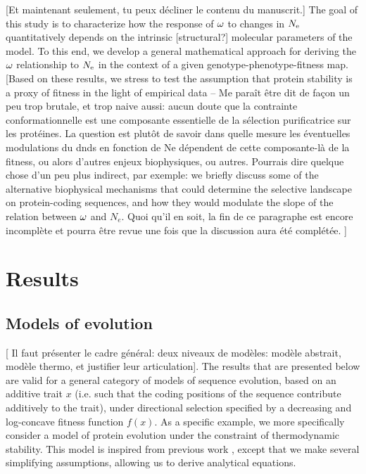 \documentclass{article}
\begin{document}
	[Et maintenant seulement, tu peux décliner le contenu du manuscrit.] The goal of this study is to characterize how the response of $\omega$ to changes in $N_{\mathrm{e}}$ quantitatively depends on the intrinsic [structural?] molecular parameters of the model. To this end, we develop a general mathematical approach for deriving the $\omega$ relationship to $N_{\mathrm{e}}$ in the context of a given genotype-phenotype-fitness map. [Based on these results, we stress to test the assumption that protein stability is a proxy of fitness in the light of empirical data -- Me paraît être dit de façon un peu trop brutale, et trop naive aussi: aucun doute que la contrainte conformationnelle est une composante essentielle de la sélection purificatrice sur les protéines. La question est plutôt de savoir dans quelle mesure les éventuelles modulations du dnds en fonction de Ne dépendent de cette composante-là de la fitness, ou alors d'autres enjeux biophysiques, ou autres. Pourrais dire quelque chose d'un peu plus indirect, par exemple: we briefly discuss some of the alternative biophysical mechanisms that could determine the selective landscape on protein-coding sequences, and how they would modulate the slope of the relation between $\omega$ and $N_e$. Quoi qu'il en soit, la fin de ce paragraphe est encore incomplète et pourra être revue une fois que la discussion aura été complétée. ]
	
	\section*{Results}
	
	\subsection*{Models of evolution}
	
	[ Il faut présenter le cadre général: deux niveaux de modèles: modèle abstrait, modèle thermo, et justifier leur articulation].
	The results that are presented below are valid for a general category of models of sequence evolution, based on an additive trait $x$ (i.e. such that the coding positions of the sequence contribute additively to the trait), under directional selection specified by a decreasing and log-concave fitness function $f(x)$. As a specific example, we more specifically consider a model of protein evolution under the constraint of thermodynamic stability. This model is inspired from previous work \cite{Williams2006, Goldstein2011, Pollock2012}, except that we make several simplifying assumptions, allowing us to derive analytical equations. 
	
\end{document}
